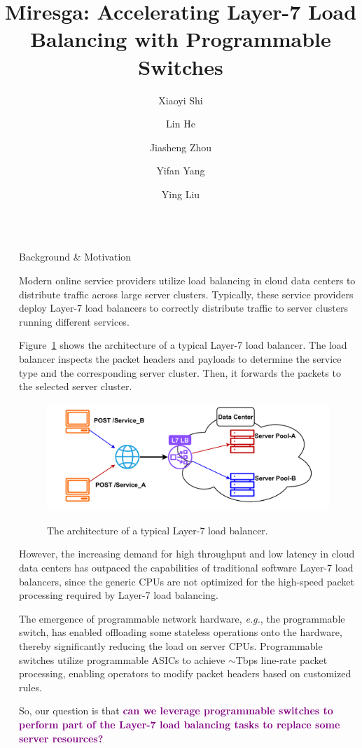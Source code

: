 \documentclass[final, 24pt]{beamer}
\title{Miresga: Accelerating Layer-7 Load Balancing with Programmable Switches}
\author{Xiaoyi Shi \and Lin He \and Jiasheng Zhou \and Yifan Yang \and Ying Liu }
\institute[shortinst]{ Institue for Network Sciences and Cyberspace, Tsinghua University}
\newlength{\sepwidth}
\newlength{\colwidth}
\newcommand{\separatorcolumn}{\begin{column}{\sepwidth}\end{column}}
\begin{document}
\begin{frame}[t]
\begin{columns}[t]
\separatorcolumn

\begin{column}{\colwidth}

  \begin{block}{Background \& Motivation}

    Modern online service providers utilize load balancing in cloud data centers to distribute traffic across large server clusters. 
    Typically, these service providers deploy Layer-7 load balancers to correctly distribute traffic to server clusters running different services.

    Figure~\ref{fig:l7lb} shows the architecture of a typical Layer-7 load balancer.
    The load balancer inspects the packet headers and payloads to determine the service type and the corresponding server cluster. Then, it forwards the packets to the selected server cluster.
    \begin{figure}
      \centering
      \includegraphics[width=0.9\colwidth]{pic/l7lb.pdf}
      \label{fig:l7lb}
      \caption{The architecture of a typical Layer-7 load balancer.}
    \end{figure}
    However, the increasing demand for high throughput and low latency in cloud data centers has outpaced the capabilities of traditional software Layer-7 load balancers, since the generic CPUs are not optimized for the high-speed packet processing required by Layer-7 load balancing.
    
    The emergence of programmable network hardware, \textit{e.g.}, the programmable switch, has enabled offloading some stateless operations onto the hardware, thereby significantly reducing the load on server CPUs. Programmable switches utilize programmable ASICs to achieve $\sim$Tbps line-rate packet processing, enabling operators to modify packet headers based on customized rules. 
    
    So, our question is that \textcolor{purple}{\selectfont\textbf{can we leverage programmable switches to perform part of the Layer-7 load balancing tasks to replace some server resources?}}


\end{block}
\end{column}
\end{columns}
\end{frame}
\end{document}

